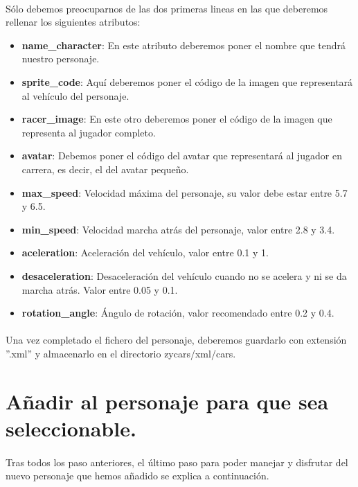 \paragraph{}
Sólo debemos preocuparnos de las dos primeras lineas en las que deberemos rellenar los siguientes atributos:

\begin{itemize}
    \item \textbf{name\_character}: En este atributo deberemos poner el nombre que tendrá nuestro personaje.
    \item \textbf{sprite\_code}: Aquí deberemos poner el código de la imagen que representará al vehículo del personaje.
    \item \textbf{racer\_image}: En este otro deberemos poner el código de la imagen que representa al jugador completo.
    \item \textbf{avatar}: Debemos poner el código del avatar que representará al jugador en carrera, es decir, 
    el del avatar pequeño.
    \item \textbf{max\_speed}: Velocidad máxima del personaje, su valor debe estar entre 5.7 y 6.5.
    \item \textbf{min\_speed}: Velocidad marcha atrás del personaje, valor entre 2.8 y 3.4.
    \item \textbf{aceleration}: Aceleración del vehículo, valor entre 0.1 y 1.
    \item \textbf{desaceleration}: Desaceleración del vehículo cuando no se acelera y ni se da marcha atrás. Valor 
    entre 0.05 y 0.1.
    \item \textbf{rotation\_angle}: Ángulo de rotación, valor recomendado entre 0.2 y 0.4.
\end{itemize}

\paragraph{}
Una vez completado el fichero del personaje, deberemos guardarlo con extensión ''.xml'' y almacenarlo en el directorio
zycars/xml/cars.

\section{Añadir al personaje para que sea seleccionable.}

\paragraph{}
Tras todos los paso anteriores, el último paso para poder manejar y disfrutar del nuevo personaje que hemos añadido se
explica a continuación.

